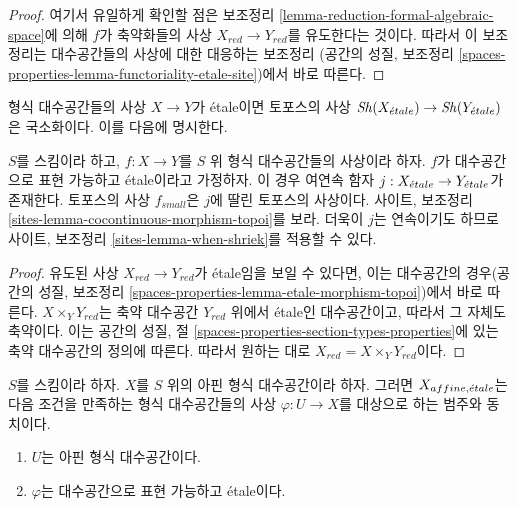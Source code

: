 \begin{proof}
여기서 유일하게 확인할 점은 보조정리
\ref{lemma-reduction-formal-algebraic-space}에 의해 $f$가
축약화들의 사상 $X_{red} \to Y_{red}$를 유도한다는 것이다.
따라서 이 보조정리는 대수공간들의 사상에 대한 대응하는 보조정리
(공간의 성질, 보조정리
\ref{spaces-properties-lemma-functoriality-etale-site})에서 바로 따른다.
\end{proof}

\noindent
형식 대수공간들의 사상 $X \to Y$가 \'etale이면 토포스의 사상
$\mathop{\mathit{Sh}}\nolimits(X_{\acute{e}tale}) \to \mathop{\mathit{Sh}}\nolimits(Y_{\acute{e}tale})$은 국소화이다.
이를 다음에 명시한다.

\begin{lemma}
\label{lemma-etale-morphism-topoi}
$S$를 스킴이라 하고, $f : X \to Y$를 $S$ 위 형식
대수공간들의 사상이라 하자. $f$가 대수공간으로 표현 가능하고
\'etale이라고 가정하자. 이 경우 여연속 함자
$j : X_{\acute{e}tale} \to Y_{\acute{e}tale}$가 존재한다.
토포스의 사상 $f_{small}$은 $j$에 딸린 토포스의 사상이다.
사이트, 보조정리 \ref{sites-lemma-cocontinuous-morphism-topoi}를 보라.
더욱이 $j$는 연속이기도 하므로 사이트, 보조정리
\ref{sites-lemma-when-shriek}를 적용할 수 있다.
\end{lemma}

\begin{proof}
유도된 사상 $X_{red} \to Y_{red}$가 \'etale임을 보일 수 있다면,
이는 대수공간의 경우(공간의 성질, 보조정리
\ref{spaces-properties-lemma-etale-morphism-topoi})에서 바로 따른다.
$X \times_Y Y_{red}$는 축약 대수공간 $Y_{red}$ 위에서
\'etale인 대수공간이고, 따라서 그 자체도 축약이다.
이는 공간의 성질, 절
\ref{spaces-properties-section-types-properties}에 있는 축약
대수공간의 정의에 따른다.
따라서 원하는 대로 $X_{red} = X \times_Y Y_{red}$이다.
\end{proof}

\begin{lemma}
\label{lemma-affine-identify-affine-etale}
$S$를 스킴이라 하자. $X$를 $S$ 위의 아핀 형식 대수공간이라 하자.
그러면 $X_{affine, {\acute{e}tale}}$는 다음 조건을 만족하는 형식
대수공간들의 사상 $\varphi : U \to X$를 대상으로 하는 범주와 동치이다.
\begin{enumerate}
\item $U$는 아핀 형식 대수공간이다.
\item $\varphi$는 대수공간으로 표현 가능하고 \'etale이다.
\end{enumerate}
\end{lemma}

